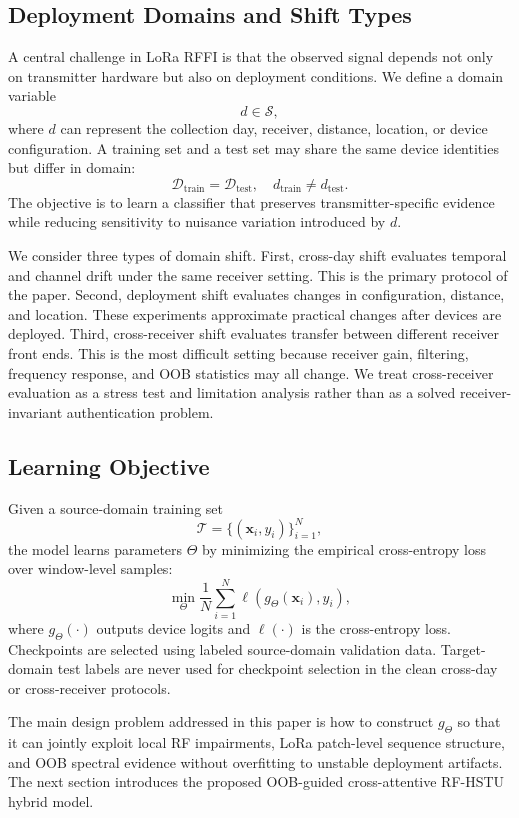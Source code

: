 \subsection{Deployment Domains and Shift Types}

A central challenge in LoRa RFFI is that the observed signal depends not only on transmitter hardware but also on deployment conditions. We define a domain variable
\begin{equation}
    d \in \mathcal{S},
\end{equation}
where $d$ can represent the collection day, receiver, distance, location, or device configuration. A training set and a test set may share the same device identities but differ in domain:
\begin{equation}
    \mathcal{D}_{\mathrm{train}} = \mathcal{D}_{\mathrm{test}},
    \quad
    d_{\mathrm{train}} \neq d_{\mathrm{test}}.
\end{equation}
The objective is to learn a classifier that preserves transmitter-specific evidence while reducing sensitivity to nuisance variation introduced by $d$.

We consider three types of domain shift. First, cross-day shift evaluates temporal and channel drift under the same receiver setting. This is the primary protocol of the paper. Second, deployment shift evaluates changes in configuration, distance, and location. These experiments approximate practical changes after devices are deployed. Third, cross-receiver shift evaluates transfer between different receiver front ends. This is the most difficult setting because receiver gain, filtering, frequency response, and OOB statistics may all change. We treat cross-receiver evaluation as a stress test and limitation analysis rather than as a solved receiver-invariant authentication problem.

\subsection{Learning Objective}

Given a source-domain training set
\begin{equation}
    \mathcal{T}
    =
    \{(\mathbf{x}_i,y_i)\}_{i=1}^{N},
\end{equation}
the model learns parameters $\Theta$ by minimizing the empirical cross-entropy loss over window-level samples:
\begin{equation}
    \min_{\Theta}
    \frac{1}{N}
    \sum_{i=1}^{N}
    \ell
    \left(
    g_{\Theta}(\mathbf{x}_i), y_i
    \right),
\end{equation}
where $g_{\Theta}(\cdot)$ outputs device logits and $\ell(\cdot)$ is the cross-entropy loss. Checkpoints are selected using labeled source-domain validation data. Target-domain test labels are never used for checkpoint selection in the clean cross-day or cross-receiver protocols.

The main design problem addressed in this paper is how to construct $g_{\Theta}$ so that it can jointly exploit local RF impairments, LoRa patch-level sequence structure, and OOB spectral evidence without overfitting to unstable deployment artifacts. The next section introduces the proposed OOB-guided cross-attentive RF-HSTU hybrid model.
